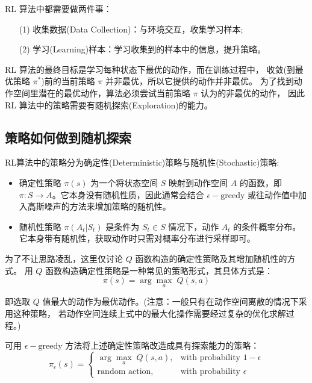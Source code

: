RL 算法中都需要做两件事：
\begin{itemize}
\setlength{\parskip}{0pt}
\item[(1)]
收集数据(Data Collection)：与环境交互，收集学习样本; 
\item[(2)]
学习(Learning)样本：学习收集到的样本中的信息，提升策略。
\end{itemize}

RL 算法的最终目标是学习每种状态下最优的动作，而在训练过程中，
收敛(到最优策略 $\pi^*$)前的当前策略 $\pi$ 并非最优，所以它提供的动作并非最优。
为了找到动作空间里潜在的最优动作，算法必须尝试当前策略 $\pi$ 认为的非最优的动作，
因此 RL 算法中的策略需要有随机探索(Exploration)的能力。

\subsection{策略如何做到随机探索}

RL算法中的策略分为确定性(Deterministic)策略与随机性(Stochastic)策略:
\begin{itemize}
\setlength{\parskip}{0pt}
\item
确定性策略 $\pi(s)$ 为一个将状态空间 $S$ 映射到动作空间 $A$ 的函数，即 
$\pi : S \rightarrow A$。它本身没有随机性质，因此通常会结合 $\epsilon-\text{greedy}$ 
或往动作值中加入高斯噪声的方法来增加策略的随机性。
\item
随机性策略 $\pi(A_t | S_t)$ 是条件为 $S_t \in S$ 情况下，动作 $A_t$ 的条件概率分布。
它本身带有随机性，获取动作时只需对概率分布进行采样即可。
\end{itemize}

为了不让思路凌乱，这里仅讨论 $Q$ 函数构造的确定性策略及其增加随机性的方式。
用 $Q$ 函数构造确定性策略是一种常见的策略形式，其具体方式是：
\begin{equation}\label{eq_argmax_policy_construction}
\pi(s)= \arg \underset{a}{\max}\; Q(s, a) 
\end{equation}

即选取 $Q$ 值最大的动作为最优动作。(注意：一般只有在动作空间离散的情况下采用这种策略，
若动作空间连续上式中的最大化操作需要经过复杂的优化求解过程。)

可用 $\epsilon-\text{greedy}$ 方法将上述确定性策略改造成具有探索能力的策略：
$$
\pi_\epsilon(s)=\begin{cases}
\arg\max_a\; Q(s,a), &\text{with probability } 1 - \epsilon \\
\text{random action}, &\text{with probability } \epsilon
\end{cases}
$$

